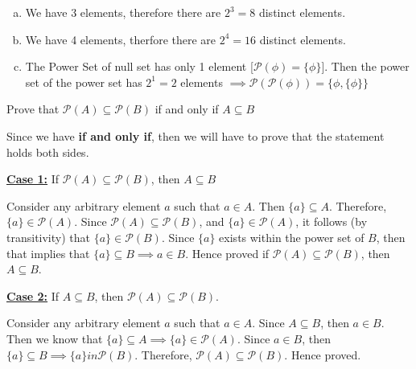 \documentclass[addpoints]{exam}
\newenvironment{problem}[2][Problem]{\begin{trivlist}
\item[\hskip \labelsep {\bfseries #1}\hskip \labelsep {\bfseries #2.}]}{\end{trivlist}}
\begin{document}
\begin{sloppypar}
    \begin{questions}
        \question
        \begin{solution}
            \begin{enumerate}[(a)]
                \item We have 3 elements, therefore there are $ 2^3 = 8 $ distinct elements.
                \item We have 4 elements, therfore there are $ 2^4 = 16 $ distinct elements.
                \item The Power Set of null set has only 1 element [$ \mathcal{P}(\phi) = \{ \phi \} $]. Then the power set of the power set has $ 2^1 = 2 $ elements $ \implies \mathcal{P}(\mathcal{P}(\phi)) = \{\phi, \{ \phi \}\} $ 
            \end{enumerate}
        \end{solution}
    \end{questions}

    \begin{problem}{5}[Chapter 2.1, Question 25]
    Prove that $ \mathcal{P}(A) \subseteq \mathcal {P}(B)$ if and only if $ A \subseteq B$
    \end{problem}

    \begin{questions}
        \question
        \begin{solution}
            
            Since we have \textbf{if and only if}, then we will have to prove that the statement holds both sides. 

            \textbf{\underline{Case 1:}} If $ \mathcal{P}(A) \subseteq \mathcal{P}(B) $, then $ A \subseteq B $ 
            
            Consider any arbitrary element $a$ such that $ a \in A $. Then $ \{a\} \subseteq A $. Therefore,  $ \{a\} \in \mathcal{P}(A) $. Since $ \mathcal{P}(A) \subseteq \mathcal{P}(B)$, and $ \{a\} \in \mathcal{P}(A) $, it follows (by transitivity) that $ \{a\} \in \mathcal{P}(B) $. Since $\{a\}$ exists within the power set of $B$, then that implies that $ \{a\} \subseteq B \implies a \in B$. Hence proved if $ \mathcal{P}(A) \subseteq \mathcal{P}(B) $, then $ A \subseteq B $. 

            \vspace*{3mm}
            \textbf{\underline{Case 2:}} If $ A \subseteq B $, then $ \mathcal{P}(A) \subseteq \mathcal{P}(B) $. 

            Consider any arbitrary element $a$ such that $a \in A$. Since $ A \subseteq B $, then $ a \in B $. Then we know that $ \{a\} \subseteq A \implies \{a\} \in \mathcal{P}(A) $. Since $ a \in B $, then $ \{a\} \subseteq B \implies \{a\} in \mathcal{P}(B) $. Therefore, $ \mathcal{P}(A) \subseteq \mathcal{P}(B) $. Hence proved.        
        \end{solution}
    \end{questions}


\end{sloppypar}
\end{document}
